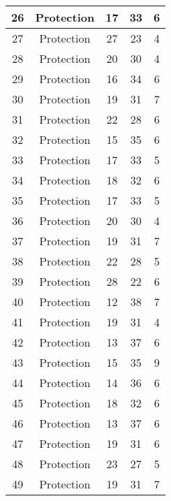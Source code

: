 \documentclass[results.tex]{subfiles}
\begin{document}
\begin{center}
\begin{tabular}{| c || c | c | c | c |}
    \hline
    26 & Protection & 17 & 33 & 6 \\ 
    \hline
    27 & Protection & 27 & 23 & 4 \\ 
    \hline
    28 & Protection & 20 & 30 & 4 \\ 
    \hline
    29 & Protection & 16 & 34 & 6 \\ 
    \hline
    30 & Protection & 19 & 31 & 7 \\ 
    \hline
    31 & Protection & 22 & 28 & 6 \\ 
    \hline
    32 & Protection & 15 & 35 & 6 \\ 
    \hline
    33 & Protection & 17 & 33 & 5 \\ 
    \hline
    34 & Protection & 18 & 32 & 6 \\ 
    \hline
    35 & Protection & 17 & 33 & 5 \\ 
    \hline
    36 & Protection & 20 & 30 & 4 \\ 
    \hline
    37 & Protection & 19 & 31 & 7 \\ 
    \hline
    38 & Protection & 22 & 28 & 5 \\ 
    \hline
    39 & Protection & 28 & 22 & 6 \\ 
    \hline
    40 & Protection & 12 & 38 & 7 \\ 
    \hline
    41 & Protection & 19 & 31 & 4 \\ 
    \hline
    42 & Protection & 13 & 37 & 6 \\ 
    \hline
    43 & Protection & 15 & 35 & 9 \\ 
    \hline
    44 & Protection & 14 & 36 & 6 \\ 
    \hline
    45 & Protection & 18 & 32 & 6 \\ 
    \hline
    46 & Protection & 13 & 37 & 6 \\ 
    \hline
    47 & Protection & 19 & 31 & 6 \\ 
    \hline
    48 & Protection & 23 & 27 & 5 \\ 
    \hline
    49 & Protection & 19 & 31 & 7 \\ 
    \hline   \end{tabular}
\end{center}
\end{document}
